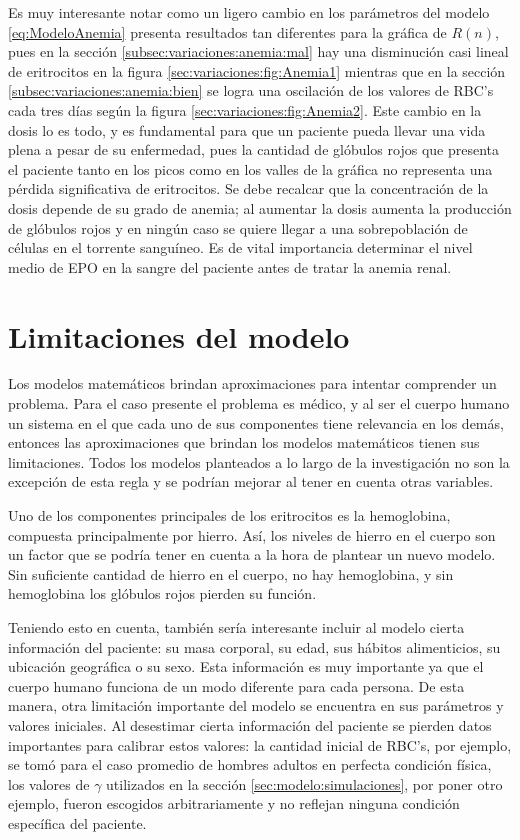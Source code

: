 Es muy interesante notar como un ligero cambio en los parámetros del modelo \ref{eq:ModeloAnemia} presenta resultados tan diferentes para la gráfica de $R(n)$, pues en la sección \ref{subsec:variaciones:anemia:mal} hay una disminución casi lineal de eritrocitos en la figura \ref{sec:variaciones:fig:Anemia1} mientras que en la sección \ref{subsec:variaciones:anemia:bien} se logra una oscilación de los valores de RBC's cada tres días según la figura \ref{sec:variaciones:fig:Anemia2}. Este cambio en la dosis lo es todo, y es fundamental para que un paciente pueda llevar una vida plena a pesar de su enfermedad, pues la cantidad de glóbulos rojos que presenta el paciente tanto en los picos como en los valles de la gráfica no representa una pérdida significativa de eritrocitos. Se debe recalcar que la concentración de la dosis depende de su grado de anemia; al aumentar la dosis aumenta la producción de glóbulos rojos y en ningún caso se quiere llegar a una sobrepoblación de células en el torrente sanguíneo. Es de vital importancia determinar el nivel medio de EPO en la sangre del paciente antes de tratar la anemia renal.

\section{Limitaciones del modelo}

Los modelos matemáticos brindan aproximaciones para intentar comprender un problema. Para el caso presente el problema es médico, y al ser el cuerpo humano un sistema en el que cada uno de sus componentes tiene relevancia en los demás, entonces las aproximaciones que brindan los modelos matemáticos tienen sus limitaciones. Todos los modelos planteados a lo largo de la investigación no son la excepción de esta regla y se podrían mejorar al tener en cuenta otras variables.

Uno de los componentes principales de los eritrocitos es la hemoglobina, compuesta principalmente por hierro. Así, los niveles de hierro en el cuerpo son un factor que se podría tener en cuenta a la hora de plantear un nuevo modelo. Sin suficiente cantidad de hierro en el cuerpo, no hay hemoglobina, y sin hemoglobina los glóbulos rojos pierden su función.

Teniendo esto en cuenta, también sería interesante incluir al modelo cierta información del paciente: su masa corporal, su edad, sus hábitos alimenticios, su ubicación geográfica o su sexo. Esta información es muy importante ya que el cuerpo humano funciona de un modo diferente para cada persona. De esta manera, otra limitación importante del modelo se encuentra en sus parámetros y valores iniciales. Al desestimar cierta información del paciente se pierden datos importantes para calibrar estos valores: la cantidad inicial de RBC's, por ejemplo, se tomó para el caso promedio de hombres adultos en perfecta condición física, los valores de $\gamma$ utilizados en la sección \ref{sec:modelo:simulaciones}, por poner otro ejemplo, fueron escogidos arbitrariamente y no reflejan ninguna condición específica del paciente. 

